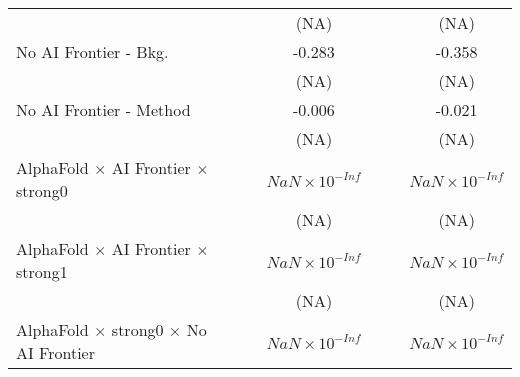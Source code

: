 \begin{tabular}{lcccccc}
                                                                              &                        &                        & (NA)                   &                        &                        & (NA)\\   
   No AI Frontier - Bkg.                                                      &                        &                        & -0.283                 &                        &                        & -0.358\\   
                                                                              &                        &                        & (NA)                   &                        &                        & (NA)\\   
   No AI Frontier - Method                                                    &                        &                        & -0.006                 &                        &                        & -0.021\\   
                                                                              &                        &                        & (NA)                   &                        &                        & (NA)\\   
   AlphaFold $\times$ AI Frontier $\times$ strong0                            &                        &                        & $NaN\times 10^{-Inf}$  &                        &                        & $NaN\times 10^{-Inf}$\\    
                                                                              &                        &                        & (NA)                   &                        &                        & (NA)\\   
   AlphaFold $\times$ AI Frontier $\times$ strong1                            &                        &                        & $NaN\times 10^{-Inf}$  &                        &                        & $NaN\times 10^{-Inf}$\\    
                                                                              &                        &                        & (NA)                   &                        &                        & (NA)\\   
   AlphaFold $\times$ strong0 $\times$ No AI Frontier                         &                        &                        & $NaN\times 10^{-Inf}$  &                        &                        & $NaN\times 10^{-Inf}$\\    

\end{tabular}

